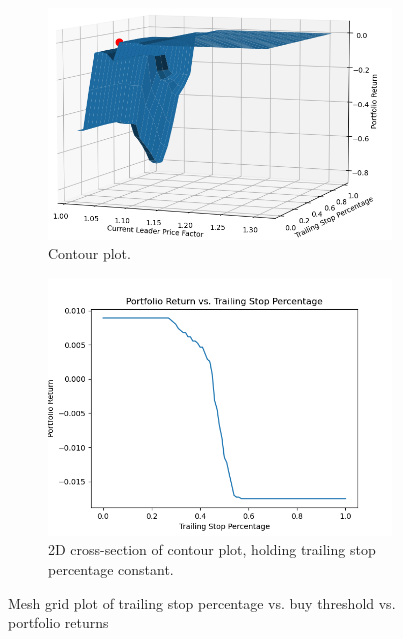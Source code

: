 \documentclass{article}
\begin{document}
\begin{figure}[H]
    \centering
    \begin{subfigure}{0.495\textwidth}
        \centering
        \includegraphics[width=\linewidth]{contourPlot.png}
        \caption{Contour plot.}
        \label{fig:contourPlot}
    \end{subfigure}
    \hfill
    \begin{subfigure}{0.495\textwidth}
        \centering
        \includegraphics[width=\linewidth]{slicePlot.png}
        \caption{2D cross-section of contour plot, holding trailing stop percentage constant.}
        \label{fig:slicePlot}
    \end{subfigure}
    \caption{Mesh grid plot of trailing stop percentage vs. buy threshold vs. portfolio returns}
    \label{fig:parameters}
\end{figure}
\end{document}
